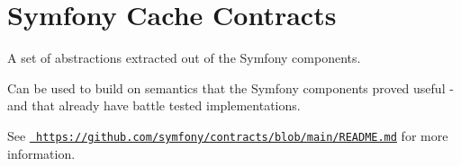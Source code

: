 \chapter{Symfony Cache Contracts}
\hypertarget{md_public_2glpi_2vendor_2symfony_2cache-contracts_2_r_e_a_d_m_e}{}\label{md_public_2glpi_2vendor_2symfony_2cache-contracts_2_r_e_a_d_m_e}
A set of abstractions extracted out of the Symfony components.

Can be used to build on semantics that the Symfony components proved useful -\/ and that already have battle tested implementations.

See \href{https://github.com/symfony/contracts/blob/main/README.md}{\texttt{ https\+://github.\+com/symfony/contracts/blob/main/\+README.\+md}} for more information. 